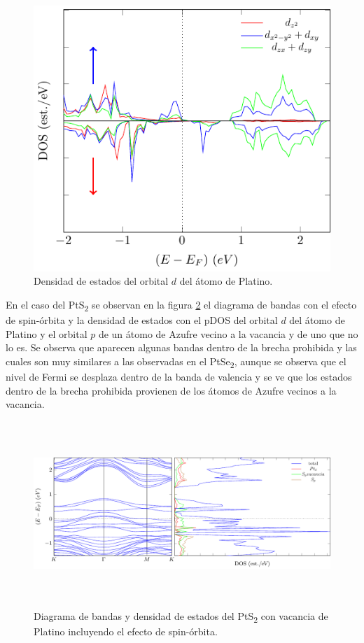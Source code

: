 \begin{figure}[!hbt]
	\centering
	\includegraphics[scale=1]{figRes/PtSe2/def/bandas/nosoc/pdosPt_3.pdf}
	\caption[Densidad de estados proyectado del orbital $d$ del Platino en el PtSe\textsubscript{2} con vacancia de Platino.]{Densidad de estados del orbital $d$ del \'atomo de Platino.}
	\label{Sim:fig:pdosPtdtse2vac}
\end{figure}  
\par En el caso del PtS\textsubscript{2} se observan en la figura \ref{Sim:fig:VacPtsocPtS2} el diagrama de bandas con el efecto de spin-\'orbita y la densidad de estados con  el pDOS del orbital $d$ del \'atomo de Platino y el orbital $p$ de un \'atomo de Azufre vecino a la vacancia y  de uno que no lo es. Se observa que aparecen algunas bandas dentro de la brecha prohibida y las cuales son muy similares a las observadas en el PtSe\textsubscript{2}, aunque se observa que el nivel de Fermi se desplaza dentro de la banda de valencia y se ve que los estados dentro de la brecha prohibida provienen de los \'atomos de Azufre vecinos a la vacancia.
\begin{figure}[!hbt]
	\centering
	\includegraphics[width=12cm, height=7cm]{figRes/PtS2/def/bandas/soc/bandasDOS.pdf}
	\caption[Diagrama de bandas y densidad de estados incluyendo el efecto de spin-\'orbita en PtS\textsubscript{2} con una vacancia de Platino]{Diagrama de bandas y densidad de estados del PtS\textsubscript{2} con vacancia de Platino incluyendo el efecto de spin-\'orbita.}
	\label{Sim:fig:VacPtsocPtS2}
\end{figure}

